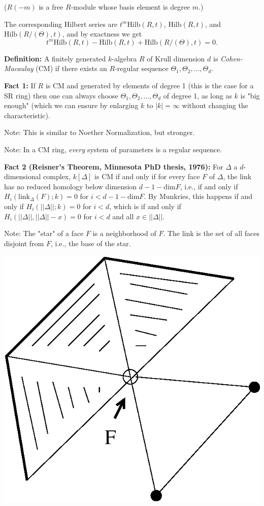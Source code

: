\documentclass{amsart}
\begin{document}
($R(-m)$ is a free $R$-module whose basis element is degree $m$.)

The corresponding Hilbert series are $t^m \textrm{Hilb}(R,t)$, $\textrm{Hilb}(R,t)$, and 
$\textrm{Hilb}(R/(\Theta),t)$, and by exactness we get
$$t^m \textrm{Hilb}(R,t) - \textrm{Hilb}(R,t) + \textrm{Hilb}(R/(\Theta),t) = 0.$$

{\bf Definition:} A finitely generated $k$-algebra $R$ of Krull dimension $d$ 
is \emph{Cohen-Macaulay} (CM) if there exists an $R$-regular sequence 
$\Theta_1, \Theta_2, \ldots, \Theta_d$.

{\bf Fact 1:} If $R$ is CM and generated by elements of degree 1 (this is the case 
for a SR ring) then one can always choose $\Theta_1, \Theta_2, \ldots, 
\Theta_d$ of degree 1, as long as $k$ is "big enough" (which we can 
ensure by enlarging $k$ to $|k| = \infty$ without changing the 
characteristic).

Note: This is similar to Noether Normalization, but stronger.

Note: In a CM ring, \emph{every} system of parameters is a regular 
sequence.

{\bf Fact 2 (Reisner's Theorem, Minnesota PhD thesis, 1976):} For $\Delta$ a $d$-dimensional 
complex, $k[\Delta]$ is CM if and only if 
for every face $F$ of $\Delta$, the link has no reduced homology below 
dimension $d-1-\textrm{dim}F$, i.e., if and only if $H_i(\textrm{link}_\Delta(F); k) = 0$ for 
$i < 
d-1-\textrm{dim}F$. By Munkries, this happens if and only if $H_i(||\Delta||;k) = 0$ 
for $i < d$, which is if and only if $H_i(||\Delta||, ||\Delta|| - x) = 0$ for $i 
< d$ and all $x \in ||\Delta||$.

Note: The "star" of a face $F$ is a neighborhood of 
$F$. The link is the set of all faces disjoint from $F$, i.e., the base 
of the star.

\begin{center}
\includegraphics[totalheight=1in]{vic3fig3}
\end{center}
\end{document}
